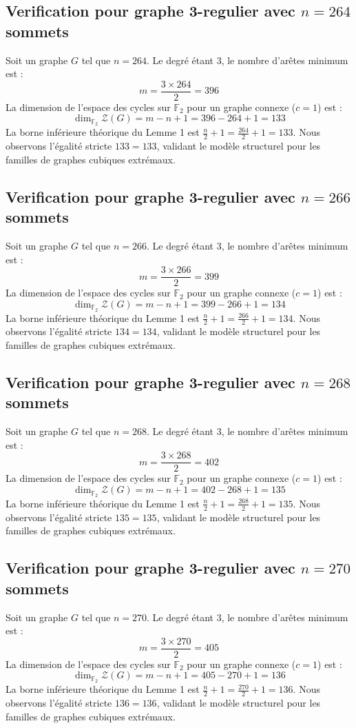 \documentclass[11pt,a4paper]{article}
\begin{document}
\subsection{Verification pour graphe 3-regulier avec $n=264$ sommets}
Soit un graphe $G$ tel que $n = 264$. Le degré étant 3, le nombre d'arêtes minimum est :
$$ m = \frac{3 \times 264}{2} = 396 $$
La dimension de l'espace des cycles sur $\mathbb{F}_2$ pour un graphe connexe ($c=1$) est :
$$ \dim_{\mathbb{F}_2} \mathcal{Z}(G) = m - n + 1 = 396 - 264 + 1 = 133 $$
La borne inférieure théorique du Lemme 1 est $\frac{n}{2} + 1 = \frac{264}{2} + 1 = 133$.
Nous observons l'égalité stricte $133 = 133$, validant le modèle structurel pour les familles de graphes cubiques extrémaux.

\subsection{Verification pour graphe 3-regulier avec $n=266$ sommets}
Soit un graphe $G$ tel que $n = 266$. Le degré étant 3, le nombre d'arêtes minimum est :
$$ m = \frac{3 \times 266}{2} = 399 $$
La dimension de l'espace des cycles sur $\mathbb{F}_2$ pour un graphe connexe ($c=1$) est :
$$ \dim_{\mathbb{F}_2} \mathcal{Z}(G) = m - n + 1 = 399 - 266 + 1 = 134 $$
La borne inférieure théorique du Lemme 1 est $\frac{n}{2} + 1 = \frac{266}{2} + 1 = 134$.
Nous observons l'égalité stricte $134 = 134$, validant le modèle structurel pour les familles de graphes cubiques extrémaux.

\subsection{Verification pour graphe 3-regulier avec $n=268$ sommets}
Soit un graphe $G$ tel que $n = 268$. Le degré étant 3, le nombre d'arêtes minimum est :
$$ m = \frac{3 \times 268}{2} = 402 $$
La dimension de l'espace des cycles sur $\mathbb{F}_2$ pour un graphe connexe ($c=1$) est :
$$ \dim_{\mathbb{F}_2} \mathcal{Z}(G) = m - n + 1 = 402 - 268 + 1 = 135 $$
La borne inférieure théorique du Lemme 1 est $\frac{n}{2} + 1 = \frac{268}{2} + 1 = 135$.
Nous observons l'égalité stricte $135 = 135$, validant le modèle structurel pour les familles de graphes cubiques extrémaux.

\subsection{Verification pour graphe 3-regulier avec $n=270$ sommets}
Soit un graphe $G$ tel que $n = 270$. Le degré étant 3, le nombre d'arêtes minimum est :
$$ m = \frac{3 \times 270}{2} = 405 $$
La dimension de l'espace des cycles sur $\mathbb{F}_2$ pour un graphe connexe ($c=1$) est :
$$ \dim_{\mathbb{F}_2} \mathcal{Z}(G) = m - n + 1 = 405 - 270 + 1 = 136 $$
La borne inférieure théorique du Lemme 1 est $\frac{n}{2} + 1 = \frac{270}{2} + 1 = 136$.
Nous observons l'égalité stricte $136 = 136$, validant le modèle structurel pour les familles de graphes cubiques extrémaux.
\end{document}
